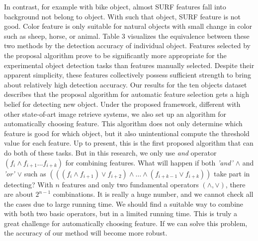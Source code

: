 In contrast, for example with bike object, almost SURF features fall
into background not belong to object. With such that object,
SURF feature is not good. Color feature is only suitable for natural
objects with small change in color such as sheep, horse, or animal.
Table 3 visualizes the equivalence between these two methods by the
detection accuracy of individual object. Features selected by the
proposal algorithm prove to be significantly more appropriate for the
experimental object detection tasks than features manually selected.
Despite their apparent simplicity, these features collectively possess
sufficient strength to bring about relatively high detection accuracy.
Our results for the ten objects dataset describes that the proposal
algorithm for automatic feature selection gets a high belief for
detecting new object.
Under the proposed framework, different with other state-of-art
image retrieve systems, we also set up an algorithm for
automatically choosing feature. This algorithm does not only
determine which feature is good for which object, but it also
unintentional compute the threshold value for each feature. Up to
present, this is the first proposed algorithm that can do both of these
tasks. But in this research, we only use \textit{and} operator $(f_i \wedge f_{i+1} \dots f_{i+k})$ for combining features. What will happen if both \textit{'and' $\wedge$ } and \textit{'or' $\vee$} such as $(((f_i \wedge f_{i+1}) \vee f_{i+2}) \wedge \dots \wedge (f_{i+k-1} \vee f_{i+k}))$ take part in detecting? With $n$ features and only two fundamental operators $(\wedge,\vee)$,
there are about $2^{n-1}$ combinations. It is really a huge number, and we
cannot check all the cases due to large running time. We should find
a suitable way to combine with both two basic operators, but in a
limited running time. This is truly a great challenge for automatically choosing feature. If we can solve this problem, the accuracy of our method will become more robust.


















